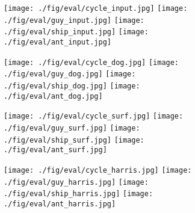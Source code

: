 \begin{figure}[ht]
	\centering
	\begin{subfigure}[t]{1\linewidth}\centering
		\makebox[0.15\linewidth]{}
	\end{subfigure}
	\begin{subfigure}[t]{1\linewidth} \centering 
		\label{fig/eval/mesh/input}	
		\makebox[0.15\linewidth]{\raisebox{0.07\linewidth}{(a) Input}} 
		\texttt{[image: ./fig/eval/cycle\_input.jpg]} 
		\texttt{[image: ./fig/eval/guy\_input.jpg]} 
		\texttt{[image: ./fig/eval/ship\_input.jpg]}
		\texttt{[image: ./fig/eval/ant\_input.jpg]} 
	\end{subfigure}
	\begin{subfigure}[t]{1\linewidth} \centering 
		\label{fig/eval/mesh/dog}	
		\makebox[0.15\linewidth]{\raisebox{0.07\linewidth}{(b) DoG}} 
		\texttt{[image: ./fig/eval/cycle\_dog.jpg]} 
		\texttt{[image: ./fig/eval/guy\_dog.jpg]} 
		\texttt{[image: ./fig/eval/ship\_dog.jpg]}
		\texttt{[image: ./fig/eval/ant\_dog.jpg]} 
	\end{subfigure}
	\begin{subfigure}[t]{1\linewidth} \centering 
		\label{fig/eval/mesh/surf}	
		\makebox[0.15\linewidth]{\raisebox{0.07\linewidth}{(c) SURF}} 
		\texttt{[image: ./fig/eval/cycle\_surf.jpg]} 
		\texttt{[image: ./fig/eval/guy\_surf.jpg]} 
		\texttt{[image: ./fig/eval/ship\_surf.jpg]}
		\texttt{[image: ./fig/eval/ant\_surf.jpg]} 
	\end{subfigure}
	\begin{subfigure}[t]{1\linewidth} \centering 
		\label{fig/eval/mesh/harris}	
		\makebox[0.15\linewidth]{\raisebox{0.07\linewidth}{(d) Harris}} 
		\texttt{[image: ./fig/eval/cycle\_harris.jpg]} 
		\texttt{[image: ./fig/eval/guy\_harris.jpg]} 
		\texttt{[image: ./fig/eval/ship\_harris.jpg]}
		\texttt{[image: ./fig/eval/ant\_harris.jpg]} 
	\end{subfigure}
	\begin{subfigure}[t]{1\linewidth} \centering 

\end{subfigure}
\end{figure}
